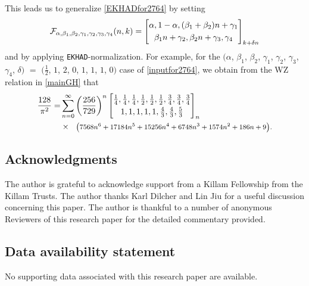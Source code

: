 \documentclass[12pt]{article}
\begin{document}
 This leads us to generalize \eqref{EKHADfor2764} by setting 
\begin{equation}\label{inputfor2764}
 \mathcal{F}_{\alpha, \beta_1, \beta_2, \gamma_1, \gamma_2, \gamma_3, \gamma_4}(n, k) 
 = \left[ \begin{matrix} 
 \alpha, 1 - \alpha, (\beta_1 + \beta_2) n + \gamma_1 \vspace{1mm} \\ 
 \beta_1 n + \gamma_2, \beta_2 n + \gamma_3, \gamma_4 
 \end{matrix} \right]_{k + \delta n} 
\end{equation}
 and by applying {\tt EKHAD}-normalization. 
 For example, for the 
 $(\alpha$, 
 $ \beta_1$, 
 $ \beta_2$,
 $ \gamma_1$, 
 $ \gamma_2$, 
 $ \gamma_3$, 
 $ \gamma_4$, 
 $ \delta) $ $ = $ 
 $ \big( \frac{1}{2}$, 
 $ 1$, $ 2$, $ 0$, $ 1$, $ 1$, $ 1$, $ 0 \big)$ case of \eqref{inputfor2764}, 
 we obtain from the WZ relation in 
 \eqref{mainGH} that 
\begin{align*}
 \frac{128}{\pi ^2} 
 = & \sum_{n = 0}^{\infty} 
 \left( \frac{256}{729} \right)^{n} 
 \left[ \begin{matrix} 
 \frac{1}{4}, \frac{1}{4}, \frac{1}{4}, \frac{1}{2}, \frac{1}{2}, \frac{1}{2}, \frac{3}{4}, \frac{3}{4}, \frac{3}{4} \vspace{1mm} \\ 
 1, 1, 1, 1, 1, \frac{4}{3}, \frac{4}{3}, \frac{5}{3} \end{matrix} \right]_{n} \\
 & \times \text{ \footnotesize{ $\big( 7568 n^6+17184 n^5+15256 n^4+6748 n^3+1574 n^2+186 n+9 \big).$}}
\end{align*}

\subsection*{Acknowledgments}
 The author is grateful to acknowledge support from a Killam Fellowship from the Killam Trusts. The author thanks Karl Dilcher and Lin 
 Jiu for a useful discussion concerning this paper. 
 The author is thankful to a number of anonymous Reviewers of this research paper 
 for the detailed commentary provided. 

\subsection*{Data availability statement}
 No supporting data associated with this research paper are available. 
\end{document}
